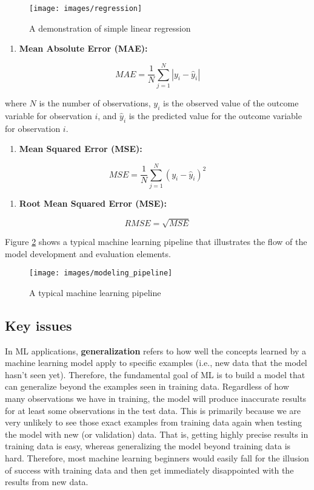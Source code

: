 \documentclass[]{book}
\providecommand{\tightlist}{%
  \setlength{\itemsep}{0pt}\setlength{\parskip}{0pt}}
\begin{document}
\begin{figure}
\texttt{[image: images/regression]} \caption{A demonstration of simple linear regression}\label{fig:fig5-3b}
\end{figure}

\begin{enumerate}
\def\labelenumi{\arabic{enumi}.}
\tightlist
\item
  \textbf{Mean Absolute Error (MAE):}
\end{enumerate}

\[
MAE = \frac{1}{N} \sum_{j=1}^N |y_i-\hat{y}_i|
\]

where \(N\) is the number of observations, \(y_i\) is the observed value of the outcome variable for observation \(i\), and \(\hat{y}_i\) is the predicted value for the outcome variable for observation \(i\).

\begin{enumerate}
\def\labelenumi{\arabic{enumi}.}
\setcounter{enumi}{1}
\tightlist
\item
  \textbf{Mean Squared Error (MSE):}
\end{enumerate}

\[
MSE = \frac{1}{N} \sum_{j=1}^N (y_i-\hat{y}_i)^2
\]

\begin{enumerate}
\def\labelenumi{\arabic{enumi}.}
\setcounter{enumi}{2}
\tightlist
\item
  \textbf{Root Mean Squared Error (MSE):}
\end{enumerate}

\[
RMSE = \sqrt{MSE}
\]

Figure \ref{fig:fig5-3c} shows a typical machine learning pipeline that illustrates the flow of the model development and evaluation elements.

\begin{figure}
\texttt{[image: images/modeling\_pipeline]} \caption{A typical machine learning pipeline}\label{fig:fig5-3c}
\end{figure}

\hypertarget{key-issues}{%
\subsection{Key issues}\label{key-issues}}

In ML applications, \textbf{generalization} refers to how well the concepts learned by a machine learning model apply to specific examples (i.e., new data that the model hasn't seen yet). Therefore, the fundamental goal of ML is to build a model that can generalize beyond the examples seen in training data. Regardless of how many observations we have in training, the model will produce inaccurate results for at least some observations in the test data. This is primarily because we are very unlikely to see those exact examples from training data again when testing the model with new (or validation) data. That is, getting highly precise results in training data is easy, whereas generalizing the model beyond training data is hard. Therefore, most machine learning beginners would easily fall for the illusion of success with training data and then get immediately disappointed with the results from new data.
\end{document}
